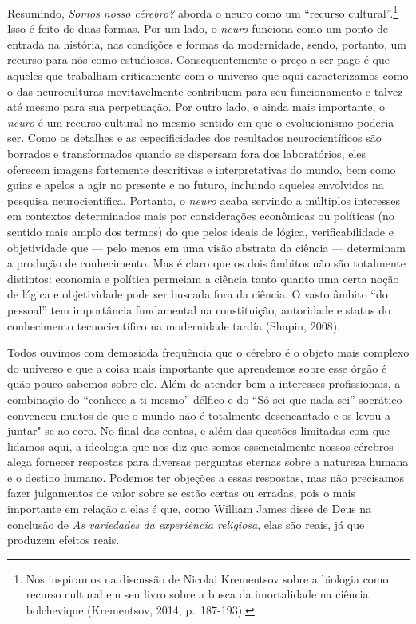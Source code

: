 Resumindo, \emph{Somos nosso cérebro?} aborda o neuro como um ``recurso
cultural''.\footnote[9]{Nos inspiramos na discussão de Nicolai Krementsov sobre a biologia
como recurso cultural em seu livro sobre a busca da imortalidade na
ciência bolchevique (Krementsov, 2014, p.~187-193).} Isso é feito de duas formas. Por um lado,
o \emph{neuro} funciona como um ponto de entrada na história, nas
condições e formas da modernidade, sendo, portanto, um recurso para nós
como estudiosos. Consequentemente o preço a ser pago é que aqueles que
trabalham criticamente com o universo que aqui caracterizamos como o das
neuroculturas inevitavelmente contribuem para seu funcionamento e talvez
até mesmo para sua perpetuação. Por outro lado, e ainda mais importante,
o \emph{neuro} é um recurso cultural no mesmo sentido em que o
evolucionismo poderia ser. Como os detalhes e as especificidades dos
resultados neurocientíficos são borrados e transformados quando se
dispersam fora dos laboratórios, eles oferecem imagens fortemente
descritivas e interpretativas do mundo, bem como guias e apelos a agir
no presente e no futuro, incluindo aqueles envolvidos na pesquisa
neurocientífica. Portanto, o \emph{neuro} acaba servindo a múltiplos
interesses em contextos determinados mais por considerações econômicas
ou políticas (no sentido mais amplo dos termos) do que pelos ideais de
lógica, verificabilidade e objetividade que --- pelo menos em uma visão
abstrata da ciência --- determinam a produção de conhecimento. Mas é
claro que os dois âmbitos não são totalmente distintos: economia e
política permeiam a ciência tanto quanto uma certa noção de lógica e
objetividade pode ser buscada fora da ciência. O vasto âmbito ``do
pessoal'' tem importância fundamental na constituição, autoridade e
status do conhecimento tecnocientífico na modernidade tardía (Shapin,
2008).

Todos ouvimos com demasiada frequência que o cérebro é o objeto mais
complexo do universo e que a coisa mais importante que aprendemos sobre
esse órgão é quão pouco sabemos sobre ele. Além de atender bem a
interesses profissionais, a combinação do ``conhece a ti mesmo'' délfico
e do ``Só sei que nada sei'' socrático convenceu muitos de que o mundo
não é totalmente desencantado e os levou a juntar"-se ao coro. No final
das contas, e além das questões limitadas com que lidamos aqui, a
ideologia que nos diz que somos essencialmente nossos cérebros alega
fornecer respostas para diversas perguntas eternas sobre a natureza
humana e o destino humano. Podemos ter objeções a essas respostas, mas
não precisamos fazer julgamentos de valor sobre se estão certas ou
erradas, pois o mais importante em relação a elas é que, como William
James disse de Deus na conclusão de \emph{As variedades da experiência
religiosa}, elas são reais, já que produzem efeitos reais.

